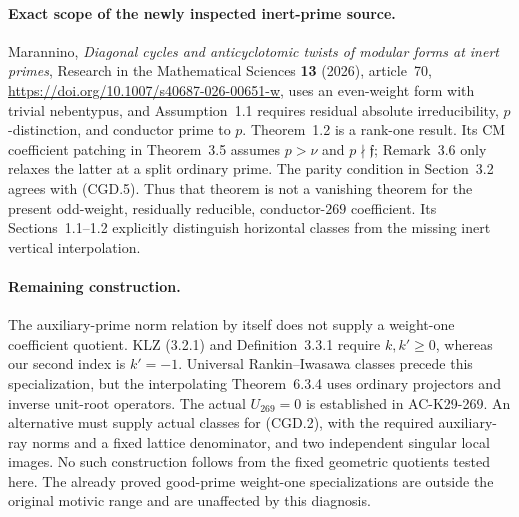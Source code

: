 \paragraph{Exact scope of the newly inspected inert-prime source.}
Marannino, \emph{Diagonal cycles and anticyclotomic twists of
modular forms at inert primes}, Research in the Mathematical
Sciences \textbf{13} (2026), article~70,
\url{https://doi.org/10.1007/s40687-026-00651-w},
uses an even-weight form with trivial nebentypus, and
Assumption~1.1 requires residual absolute irreducibility,
\(p\)-distinction, and conductor prime to \(p\).
Theorem~1.2 is a rank-one result. Its CM coefficient
patching in Theorem~3.5 assumes \(p>\nu\) and
\(p\nmid\mathfrak f\); Remark~3.6 only relaxes the
latter at a split ordinary prime. The parity condition
in Section~3.2 agrees with (CGD.5).
Thus that theorem is not a vanishing theorem for the
present odd-weight, residually reducible,
conductor-\(269\) coefficient. Its Sections~1.1--1.2
explicitly distinguish horizontal classes from the
missing inert vertical interpolation.

\paragraph{Remaining construction.}
The auxiliary-prime norm relation by itself does not
supply a weight-one coefficient quotient. KLZ (3.2.1)
and Definition~3.3.1 require \(k,k'\ge0\), whereas
our second index is \(k'=-1\). Universal
Rankin--Iwasawa classes precede this specialization,
but the interpolating Theorem~6.3.4 uses ordinary
projectors and inverse unit-root operators. The
actual \(U_{269}=0\) is established in AC-K29-269.
An alternative must supply actual classes for (CGD.2),
with the required auxiliary-ray norms and a fixed
lattice denominator, and two independent singular
local images. No such construction follows from the
fixed geometric quotients tested here. The
already proved good-prime weight-one specializations
are outside the original motivic range and are
unaffected by this diagnosis.
